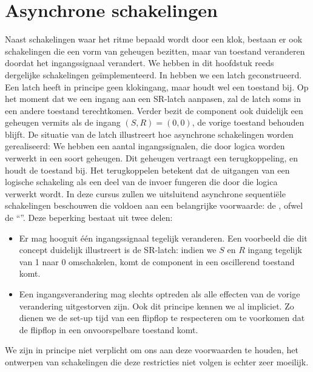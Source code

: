 \section{Asynchrone schakelingen}
Naast schakelingen waar het ritme bepaald wordt door een klok, bestaan er ook schakelingen die een vorm van geheugen bezitten, maar van toestand veranderen doordat het ingangssignaal verandert. We hebben in dit hoofdstuk reeds dergelijke schakelingen ge\"implementeerd. In  hebben we een latch geconstrueerd. Een latch heeft in principe geen klokingang, maar houdt wel een toestand bij. Op het moment dat we een ingang aan een SR-latch aanpasen, zal de latch soms in een andere toestand terechtkomen. Verder bezit de component ook duidelijk een geheugen vermits als de ingang $\left(S,R\right)=\left(0,0\right)$, de vorige toestand behouden blijft. De situatie van de latch illustreert hoe asynchrone schakelingen worden gerealiseerd: We hebben een aantal ingangssignalen, die door logica worden verwerkt in een soort geheugen. Dit geheugen vertraagt een terugkoppeling, en houdt de toestand bij. Het terugkoppelen betekent dat de uitgangen van een logische schakeling als een deel van de invoer fungeren die door die logica verwerkt wordt. In deze cursus zullen we uitsluitend asynchrone sequenti\"ele schakelingen beschouwen die voldoen aan een belangrijke voorwaarde: de , ofwel de ``''. Deze beperking bestaat uit twee delen:
\begin{itemize}
 \item Er mag hooguit \'e\'en ingangssignaal tegelijk veranderen. Een voorbeeld die dit concept duidelijk illustreert is de SR-latch: indien we $S$ en $R$ ingang tegelijk van 1 naar 0 omschakelen, komt de component in een oscillerend toestand komt.
 \item Een ingangsverandering mag slechts optreden als alle effecten van de vorige verandering uitgestorven zijn. Ook dit principe kennen we al impliciet. Zo dienen we de set-up tijd van een flipflop te respecteren om te voorkomen dat de flipflop in een onvoorspelbare toestand komt.
\end{itemize}
We zijn in principe niet verplicht om ons aan deze voorwaarden te houden, het ontwerpen van schakelingen die deze restricties niet volgen is echter zeer moeilijk.
